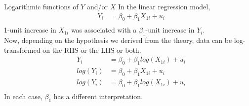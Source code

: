 \documentclass[notes,10pt, aspectratio=169]{beamer}
\begin{document}
\begin{frame}{Logarithmic functions of $Y$ and/or $X$}
In the linear regression model,
\begin{eqnarray*}
    &Y_i &= \beta_0 + \beta_1 X_{1i} + u_i\\
\end{eqnarray*}
1-unit increase in $X_{1i}$ was associated with a $\beta_1$-unit increase in $Y_i$.\\[1em] 

Now, depending on the hypothesis we derived from the theory, data can be log-transformed on the RHS or the LHS or both.\\

\begin{eqnarray*}
    &Y_i &= \beta_0 + \beta_1 log(X_{1i}) + u_i\\
    &log(Y_i) &= \beta_0 + \beta_1 X_{1i} + u_i\\
    &log(Y_i) &= \beta_0 + \beta_1 log(X_{1i}) + u_i\\
\end{eqnarray*}
In each case, $\beta_1$ has a different interpretation.
\end{frame}
\end{document}
